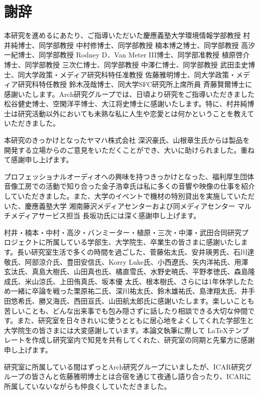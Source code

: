 \chapter*{謝辞}
\label{thanks}

本研究を進めるにあたり、ご指導いただいた慶應義塾大学環境情報学部教授 村井純博士、同学部教授 中村修博士、同学部教授 楠本博之博士、同学部教授 高汐一紀博士、同学部教授 Rodney D．Van Meter III博士、同学部准教授 植原啓介博士、同学部教授 三次仁博士、同学部教授 中澤仁博士、同学部教授 武田圭史博士、同大学政策・メディア研究科特任准教授 佐藤雅明博士、同大学政策・メディア研究科特任教授 鈴木茂哉博士、同大学SFC研究所上席所員 斉藤賢爾博士に感謝いたします。Arch研究グループでは、日頃より研究をご指導いただきました松谷健史博士、空閑洋平博士、大江将史博士に感謝いたします。特に、村井純博士は研究活動以外においても未熟な私に人生や恋愛とは何かということを教えていただきました。

本研究のきっかけとなったヤマハ株式会社 深沢豪氏、山根章生氏からは製品を開発する立場からのご意見をいただくことができ、大いに助けられました。重ねて感謝申し上げます。

プロフェッショナルオーディオへの興味を持つきっかけとなった、福利厚生団体音像工房での活動で知り合った金子浩幸氏は私に多くの音響や映像の仕事を紹介していただきました。また、大学のイベントで機材の特別貸出を実施していただいた、慶應義塾大学 湘南藤沢メディアセンターおよび同メディアセンター マルチメディアサービス担当 長坂功氏には深く感謝申し上げます。

村井・楠本・中村・高汐・バンミーター・植原・三次・中澤・武田合同研究プロジェクトに所属している学部生、大学院生、卒業生の皆さまに感謝いたします。長い研究室生活で多くの時間を過ごした、菅藤佑太氏、安井瑛男氏、石川達敬氏、阿部涼介氏、豊田安信氏、Korry Luke氏、小西遼氏、矢内洋祐氏、用澤玄汰氏、真島大樹氏、山田真也氏、橘直雪氏、水野史暁氏、平野孝徳氏、森島隆成氏、米山涼氏、上田侑真氏、坂本優
太氏、根本樹氏、さらには1年休学したため一緒に卒論を戦った栗原祐二氏、深川祐太氏、鈴木雄祐氏、島津翔太氏、井手田悠希氏、勝又海氏、西田亘氏、山田航太郎氏に感謝いたします。楽しいことも苦しいことも、どんな出来事でも包み隠さずに話したり相談できる大切な仲間です。また、研究室を日々きれいに使うとともに居心地をよくしてくれた学部生と大学院生の皆さまには大変感謝しています。本論文執筆に際して \LaTeX テンプレートを作成し研究室内で知見を共有してくれた、研究室の同期と先輩方に感謝申し上げます。

研究室に所属している間はずっとArch研究グループにいましたが、ICAR研究グループの皆さんと佐藤雅明博士とは合宿を通じて夜通し語り合ったり、ICARに所属していないながらも仲良くしていただきました。

